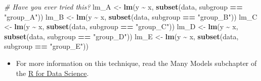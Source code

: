 \documentclass[
]{book}
\newenvironment{Shaded}{\begin{snugshade}}{\end{snugshade}}
\newcommand{\CommentTok}[1]{\textcolor[rgb]{0.56,0.35,0.01}{\textit{#1}}}
\newcommand{\ControlFlowTok}[1]{\textcolor[rgb]{0.13,0.29,0.53}{\textbf{#1}}}
\newcommand{\DataTypeTok}[1]{\textcolor[rgb]{0.13,0.29,0.53}{#1}}
\newcommand{\DecValTok}[1]{\textcolor[rgb]{0.00,0.00,0.81}{#1}}
\newcommand{\KeywordTok}[1]{\textcolor[rgb]{0.13,0.29,0.53}{\textbf{#1}}}
\newcommand{\NormalTok}[1]{#1}
\newcommand{\OperatorTok}[1]{\textcolor[rgb]{0.81,0.36,0.00}{\textbf{#1}}}
\newcommand{\StringTok}[1]{\textcolor[rgb]{0.31,0.60,0.02}{#1}}
\providecommand{\tightlist}{%
  \setlength{\itemsep}{0pt}\setlength{\parskip}{0pt}}
\begin{document}
\begin{Shaded}
\begin{Highlighting}[]
\CommentTok{\# Have you ever tried this?}
\NormalTok{lm\_A \textless{}{-}}\StringTok{ }\KeywordTok{lm}\NormalTok{(y }\OperatorTok{\textasciitilde{}}\StringTok{ }\NormalTok{x, }\KeywordTok{subset}\NormalTok{(data, subgroup }\OperatorTok{==}\StringTok{ "group\_A"}\NormalTok{))}
\NormalTok{lm\_B \textless{}{-}}\StringTok{ }\KeywordTok{lm}\NormalTok{(y }\OperatorTok{\textasciitilde{}}\StringTok{ }\NormalTok{x, }\KeywordTok{subset}\NormalTok{(data, subgroup }\OperatorTok{==}\StringTok{ "group\_B"}\NormalTok{))}
\NormalTok{lm\_C \textless{}{-}}\StringTok{ }\KeywordTok{lm}\NormalTok{(y }\OperatorTok{\textasciitilde{}}\StringTok{ }\NormalTok{x, }\KeywordTok{subset}\NormalTok{(data, subgroup }\OperatorTok{==}\StringTok{ "group\_C"}\NormalTok{))}
\NormalTok{lm\_D \textless{}{-}}\StringTok{ }\KeywordTok{lm}\NormalTok{(y }\OperatorTok{\textasciitilde{}}\StringTok{ }\NormalTok{x, }\KeywordTok{subset}\NormalTok{(data, subgroup }\OperatorTok{==}\StringTok{ "group\_D"}\NormalTok{))}
\NormalTok{lm\_E \textless{}{-}}\StringTok{ }\KeywordTok{lm}\NormalTok{(y }\OperatorTok{\textasciitilde{}}\StringTok{ }\NormalTok{x, }\KeywordTok{subset}\NormalTok{(data, subgroup }\OperatorTok{==}\StringTok{ "group\_E"}\NormalTok{))}
\end{Highlighting}
\end{Shaded}

\begin{itemize}
\tightlist
\item
  For more information on this technique, read the Many Models subchapter of the \href{https://r4ds.had.co.nz/many-models.html\#creating-list-columns}{R for Data Science}.
\end{itemize}

\begin{Shaded}
\end{Shaded}
\end{document}
